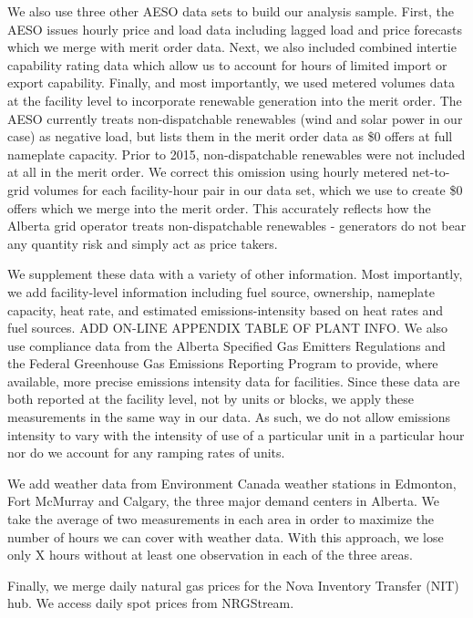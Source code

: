 \documentclass[12pt]{article}
\begin{document}
We also use three other AESO data sets to build our analysis sample. First, the AESO issues hourly price and load data including lagged load and price forecasts which we merge with merit order data. Next, we also included combined intertie capability rating data which allow us to account for hours of limited import or export capability. Finally, and most importantly, we used metered volumes data at the facility level to incorporate renewable generation into the merit order. The AESO currently treats non-dispatchable renewables (wind and solar power in our case) as negative load, but lists them in the merit order data as \$0 offers at full nameplate capacity. Prior to 2015, non-dispatchable renewables were not included at all in the merit order. We correct this omission using hourly metered net-to-grid volumes for each facility-hour pair in our data set, which we use to create \$0 offers which we merge into the merit order. This accurately reflects how the Alberta grid operator treats non-dispatchable renewables - generators do not bear any quantity risk and simply act as price takers.

We supplement these data with a variety of other information.  Most importantly, we add facility-level information including fuel source, ownership, nameplate capacity, heat rate, and estimated emissions-intensity based on heat rates and fuel sources.  ADD ON-LINE APPENDIX TABLE OF PLANT INFO. We also use compliance data from the Alberta Specified Gas Emitters Regulations and the Federal Greenhouse Gas Emissions Reporting Program to provide, where available, more precise emissions intensity data for facilities.  Since these data are both reported at the facility level, not by units or blocks, we apply these measurements in the same way in our data.  As such, we do not allow emissions intensity to vary with the intensity of use of a particular unit in a particular hour nor do we account for any ramping rates of units.

We add weather data from Environment Canada weather stations in Edmonton, Fort McMurray and Calgary, the three major demand centers in Alberta.  We take the average of two measurements in each area in order to maximize the number of hours we can cover with weather data.  With this approach, we lose only X hours without at least one observation in each of the three areas.

Finally, we merge daily natural gas prices for the Nova Inventory Transfer (NIT) hub.  We access daily spot prices from NRGStream.
\end{document}
